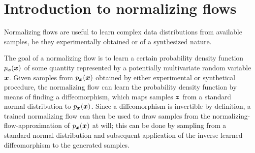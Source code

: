 \documentclass[a4paper,11pt]{report}
\begin{document}
%
\FloatBarrier

\section{Introduction to normalizing flows}
Normalizing flows are useful to learn complex data distributions from available samples, be they experimentally obtained or of a synthesized nature. 

The goal of a normalizing flow is to learn a certain probability density function $p_{\bm{x}}(\bm{x})$ of some quantity represented by a potentially multivariate random variable $\bm{x}$. Given samples from $p_{\bm{x}}(\bm{x})$ obtained by either experimental or synthetical procedure, the normalizing flow can learn the probability density function by means of finding a diffeomorphism, which maps samples $\bm{z}$ from a standard normal distribution to $p_{\bm{x}}(\bm{x})$. Since a diffeomorphism is invertible by definition, a trained normalizing flow can then be used to draw samples from the normalizing-flow-approximation of $p_{\bm{x}}(\bm{x})$ at will; this can be done by sampling from a standard normal distribution and subsequent application of the inverse learned diffeomorphism to the generated samples.
\end{document}
